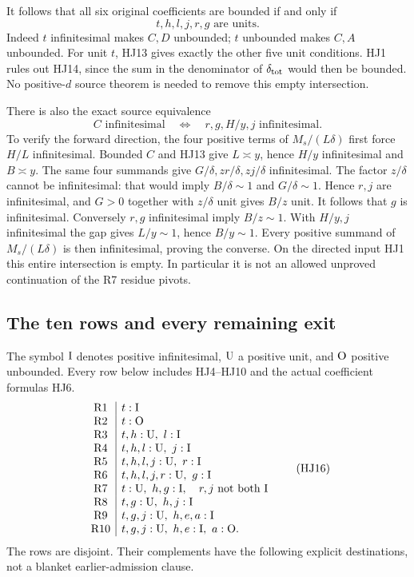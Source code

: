 It follows that all six original coefficients are bounded
if and only if
\[
             t,h,l,j,r,g\text{ are units}.
 \tag{HJ14}
\]
Indeed \(t\) infinitesimal makes \(C,D\) unbounded;
\(t\) unbounded makes \(C,A\) unbounded.
For unit \(t\), HJ13 gives exactly the other five
unit conditions.  HJ1 rules out HJ14, since the
sum in the denominator of \(\delta_{\rm tot}\)
would then be bounded.  No positive-\(d\) source
theorem is needed to remove this empty intersection.

There is also the exact source equivalence
\[
 C\text{ infinitesimal}
 \quad\Longleftrightarrow\quad
 r,g,H/y,j\text{ infinitesimal}.
 \tag{HJ15}
\]
To verify the forward direction, the four positive
terms of \(M_s/(L\delta)\) first force \(H/L\)
infinitesimal.  Bounded \(C\) and HJ13 give
\(L\asymp y\), hence \(H/y\) infinitesimal and
\(B\asymp y\).  The same four summands give
\(G/\delta,zr/\delta,zj/\delta\) infinitesimal.
The factor \(z/\delta\) cannot be infinitesimal:
that would imply \(B/\delta\sim1\) and
\(G/\delta\sim1\).  Hence \(r,j\) are infinitesimal,
and \(G>0\) together with \(z/\delta\) unit gives
\(B/z\) unit.  It follows that \(g\) is infinitesimal.
Conversely \(r,g\) infinitesimal imply \(B/z\sim1\).
With \(H/y,j\) infinitesimal the gap gives
\(L/y\sim1\), hence \(B/y\sim1\).
Every positive summand of \(M_s/(L\delta)\) is then
infinitesimal, proving the converse.
On the directed input HJ1 this entire intersection
is empty.  In particular it is not an allowed
unproved continuation of the R7 residue pivots.

\subsection{The ten rows and every remaining exit}

The symbol \({\rm I}\) denotes positive infinitesimal,
\({\rm U}\) a positive unit, and \({\rm O}\) positive
unbounded.  Every row below includes HJ4--HJ10 and
the actual coefficient formulas HJ6.
\[
\begin{array}{c|l}
 {\rm R1}&t:{\rm I}\\
 {\rm R2}&t:{\rm O}\\
 {\rm R3}&t,h:{\rm U},\ l:{\rm I}\\
 {\rm R4}&t,h,l:{\rm U},\ j:{\rm I}\\
 {\rm R5}&t,h,l,j:{\rm U},\ r:{\rm I}\\
 {\rm R6}&t,h,l,j,r:{\rm U},\ g:{\rm I}\\
 {\rm R7}&t:{\rm U},\ h,g:{\rm I},
                  \quad r,j\text{ not both }{\rm I}\\
 {\rm R8}&t,g:{\rm U},\ h,j:{\rm I}\\
 {\rm R9}&t,g,j:{\rm U},\ h,e,a:{\rm I}\\
 {\rm R10}&t,g,j:{\rm U},\ h,e:{\rm I},\ a:{\rm O}.
\end{array}
\tag{HJ16}
\]
The rows are disjoint.  Their complements have the
following explicit destinations, not a blanket
earlier-admission clause.

